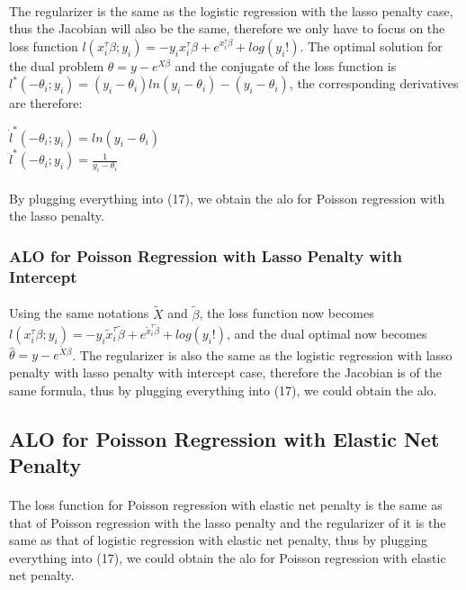 \documentclass{article}
\begin{document}
\paragraph{}The regularizer is the same as the logistic regression with the lasso penalty case, thus the Jacobian will also be the same, therefore we only have to focus on the loss function $l(x_{i}^{\tau}\beta ; y_{i}) = -y_{i}x_{i}^{\tau}\beta+e^{x_{i}^{\tau}\beta}+log(y_{i}!)$. The optimal solution for the dual problem $\hat{\theta} = y - e^{X\beta}$ and the conjugate of the loss function is $l^{*}(-\theta_{i};y_{i}) = (y_{i}-\theta_{i})ln(y_{i}-\theta_{i})-(y_{i}-\theta_{i})$, the corresponding derivatives are therefore:
\begin{center}
$\dot{l}^{*}(-\theta_{i};y_{i}) = ln(y_{i}-\theta_{i})$\\
$\ddot{l}^{*}(-\theta_{i};y_{i}) = \frac{1}{y_{i}-\theta_{i}}$
\end{center}
\paragraph{}By plugging everything into (17), we obtain the alo for Poisson regression with the lasso penalty.
\subsubsection{ALO for Poisson Regression with Lasso Penalty with Intercept}
\paragraph{}Using the same notations $\tilde{X}$ and $\tilde{\beta}$, the loss function now becomes $l(x_{i}^{\tau}\beta ; y_{i}) = -y_{i}\tilde{x}_{i}^{\tau}\tilde{\beta}+e^{\tilde{x}_{i}^{\tau}\tilde{\beta}}+log(y_{i}!)$, and the dual optimal now becomes $\hat{\theta} = y - e^{\tilde{X}\beta}$. The regularizer is also the same as the logistic regression with lasso penalty with lasso penalty with intercept case, therefore the Jacobian is of the same formula, thus by plugging everything into (17), we could obtain the alo.
\subsection{ALO for Poisson Regression with Elastic Net Penalty}
\paragraph{}The loss function for Poisson regression with elastic net penalty is the same as that of Poisson regression with the lasso penalty and the regularizer of it is the same as that of logistic regression with elastic net penalty, thus by plugging everything into (17), we could obtain the alo for Poisson regression with elastic net penalty.
\end{document}
